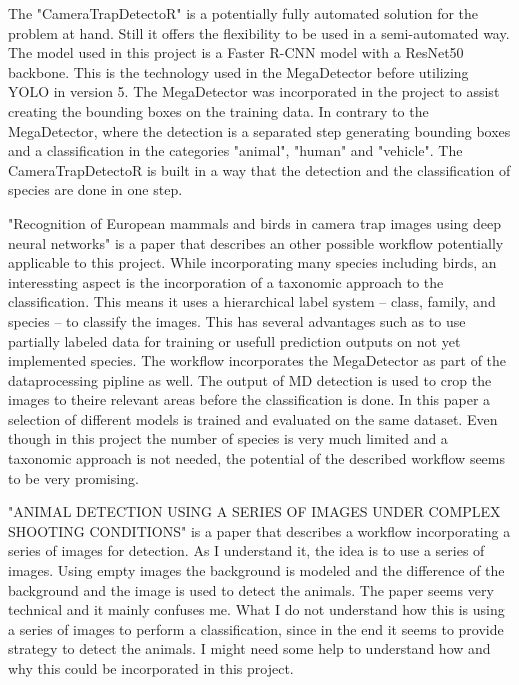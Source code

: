 \documentclass{article}
\begin{document}
The "CameraTrapDetectoR" \autocite{tabakCameraTrapDetectoRAutomaticallyDetect2022} is a potentially fully automated solution for the problem at hand.
Still it offers the flexibility to be used in a semi-automated way. The model used in this project is a Faster R-CNN model with a ResNet50 backbone.
This is the technology used in the MegaDetector before utilizing YOLO in version 5. The MegaDetector was incorporated in the project to
assist creating the bounding boxes on the training data. In contrary to the MegaDetector, where the detection is a separated step generating
bounding boxes and a classification in the categories "animal", "human" and "vehicle". The CameraTrapDetectoR is built in a way that 
the detection and the classification of species are done in one step.\par
\vspace{10pt}

"Recognition of European mammals and birds in camera trap  images using deep neural networks" \autocite{schneiderRecognitionEuropeanMammals2024}
is a paper that describes an other possible workflow potentially applicable to this project. While incorporating many species including birds,
an interessting aspect is the incorporation of a taxonomic approach to the classification.
This means it uses a hierarchical label system -- class, family, and species -- to classify the images. This has several advantages such as
to use partially labeled data for training or usefull prediction outputs on not yet implemented species.
The workflow incorporates the MegaDetector as part of the dataprocessing pipline as well. The output of MD detection is used to crop the images
to theire relevant areas before the classification is done. In this paper a selection of different models is trained and evaluated on the same
dataset. Even though in this project the number of species is very much limited and a taxonomic approach is not needed, the potential of
the described workflow seems to be very promising.\par
\vspace{10pt}

"ANIMAL DETECTION USING A SERIES OF IMAGES UNDER COMPLEX SHOOTING CONDITIONS" \autocite{zotinANIMALDETECTIONUSING2019} is a paper
that describes a workflow incorporating a series of images for detection. As I understand it, the idea is to use a series of images.
Using empty images the background is modeled and the difference of the background and the image is used to detect the animals.
The paper seems very technical and it mainly confuses me. What I do not understand how this is using a series of images to perform a
classification, since in the end it seems to provide strategy to detect the animals. I might need some help to understand how and why this
could be incorporated in this project.\par
\vspace{10pt}
\end{document}
